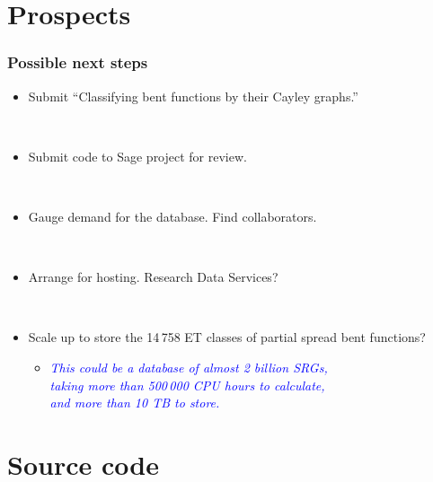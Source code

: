 \documentclass[pdf,sprung,slideColor,nocolorBG]{beamer}
\newenvironment{colortheme}[1]{
\def\ProvidesPackageRCS $##1${\relax}
\renewcommand{\ProcessOptions}{\relax}
\makeatletter

\makeatother
}{}
\newcommand{\Emph}[1]{\emph{\textcolor{blue}{#1}}}
\begin{document}
\begin{colortheme}{jubata}
\end{colortheme}

\section{Prospects}

\begin{colortheme}{jubata}

\begin{frame}[fragile]
\frametitle{Possible next steps}

\begin{itemize}
 \item
Submit ``Classifying bent functions by their Cayley graphs.''

~

 \item
Submit code to Sage project for review.

~

 \item
Gauge demand for the database. Find collaborators.

~

 \item
Arrange for hosting. Research Data Services?

~

 \item
Scale up to store the 14\,758 ET classes of partial spread bent functions?

 \begin{itemize}
  \item
\Emph{This could be a database of almost 2 billion SRGs,
\\
taking more than 500\,000 CPU hours to calculate,
\\
and more than 10 TB to store.}
 \end{itemize}
\end{itemize}
\end{frame}

\end{colortheme}

\section{Source code}
\end{document}
